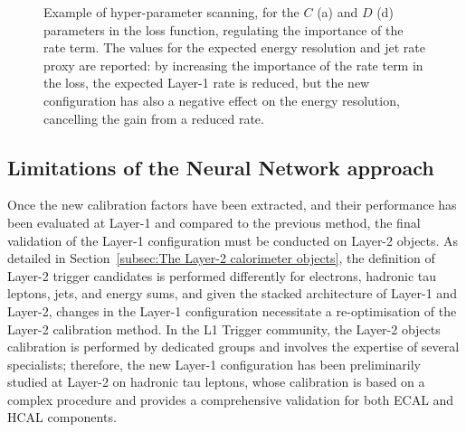 \begin{figure}
    \centering
    \hspace{1cm}
    \caption{Example of hyper-parameter scanning, for the $C$ (a) and $D$ (d) parameters in the loss function, regulating the importance of the rate term. The values for the expected energy resolution and jet rate proxy are reported: by increasing the importance of the rate term in the loss, the expected Layer-1 rate is reduced, but the new configuration has also a negative effect on the energy resolution, cancelling the gain from a reduced rate.}
    \label{fig:NN_HyperParameters}
\end{figure}

\subsection{Limitations of the Neural Network approach}

Once the new calibration factors have been extracted, and their performance has been evaluated at Layer-1 and compared to the previous method, the final validation of the Layer-1 configuration must be conducted on Layer-2 objects. 
As detailed in Section~\ref{subsec:The Layer-2 calorimeter objects}, the definition of Layer-2 trigger candidates is performed differently for electrons, hadronic tau leptons, jets, and energy sums, and given the stacked architecture of Layer-1 and Layer-2, changes in the Layer-1 configuration necessitate a re-optimisation of the Layer-2 calibration method. 
In the L1 Trigger community, the Layer-2 objects calibration is performed by dedicated groups and involves the expertise of several specialists; therefore, the new Layer-1 configuration has been preliminarily studied at Layer-2 on hadronic tau leptons, whose calibration is based on a complex procedure and provides a comprehensive validation for both ECAL and HCAL components.

